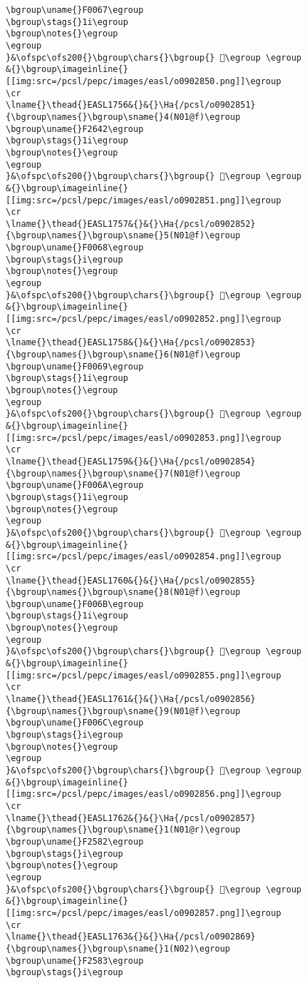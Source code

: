 \begin{verbatim}
\bgroup\uname{}F0067\egroup
\bgroup\stags{}1i\egroup
\bgroup\notes{}\egroup
\egroup
}&\ofspc\ofs200{}\bgroup\chars{}\bgroup{} 󰁧\egroup \egroup
&{}\bgroup\imageinline{}[[img:src=/pcsl/pepc/images/easl/o0902850.png]]\egroup
\cr
\lname{}\thead{}EASL1756&{}&{}\Ha{/pcsl/o0902851}{\bgroup\names{}\bgroup\sname{}4(N01@f)\egroup
\bgroup\uname{}F2642\egroup
\bgroup\stags{}1i\egroup
\bgroup\notes{}\egroup
\egroup
}&\ofspc\ofs200{}\bgroup\chars{}\bgroup{} 󲙂\egroup \egroup
&{}\bgroup\imageinline{}[[img:src=/pcsl/pepc/images/easl/o0902851.png]]\egroup
\cr
\lname{}\thead{}EASL1757&{}&{}\Ha{/pcsl/o0902852}{\bgroup\names{}\bgroup\sname{}5(N01@f)\egroup
\bgroup\uname{}F0068\egroup
\bgroup\stags{}i\egroup
\bgroup\notes{}\egroup
\egroup
}&\ofspc\ofs200{}\bgroup\chars{}\bgroup{} 󰁨\egroup \egroup
&{}\bgroup\imageinline{}[[img:src=/pcsl/pepc/images/easl/o0902852.png]]\egroup
\cr
\lname{}\thead{}EASL1758&{}&{}\Ha{/pcsl/o0902853}{\bgroup\names{}\bgroup\sname{}6(N01@f)\egroup
\bgroup\uname{}F0069\egroup
\bgroup\stags{}1i\egroup
\bgroup\notes{}\egroup
\egroup
}&\ofspc\ofs200{}\bgroup\chars{}\bgroup{} 󰁩\egroup \egroup
&{}\bgroup\imageinline{}[[img:src=/pcsl/pepc/images/easl/o0902853.png]]\egroup
\cr
\lname{}\thead{}EASL1759&{}&{}\Ha{/pcsl/o0902854}{\bgroup\names{}\bgroup\sname{}7(N01@f)\egroup
\bgroup\uname{}F006A\egroup
\bgroup\stags{}1i\egroup
\bgroup\notes{}\egroup
\egroup
}&\ofspc\ofs200{}\bgroup\chars{}\bgroup{} 󰁪\egroup \egroup
&{}\bgroup\imageinline{}[[img:src=/pcsl/pepc/images/easl/o0902854.png]]\egroup
\cr
\lname{}\thead{}EASL1760&{}&{}\Ha{/pcsl/o0902855}{\bgroup\names{}\bgroup\sname{}8(N01@f)\egroup
\bgroup\uname{}F006B\egroup
\bgroup\stags{}1i\egroup
\bgroup\notes{}\egroup
\egroup
}&\ofspc\ofs200{}\bgroup\chars{}\bgroup{} 󰁫\egroup \egroup
&{}\bgroup\imageinline{}[[img:src=/pcsl/pepc/images/easl/o0902855.png]]\egroup
\cr
\lname{}\thead{}EASL1761&{}&{}\Ha{/pcsl/o0902856}{\bgroup\names{}\bgroup\sname{}9(N01@f)\egroup
\bgroup\uname{}F006C\egroup
\bgroup\stags{}i\egroup
\bgroup\notes{}\egroup
\egroup
}&\ofspc\ofs200{}\bgroup\chars{}\bgroup{} 󰁬\egroup \egroup
&{}\bgroup\imageinline{}[[img:src=/pcsl/pepc/images/easl/o0902856.png]]\egroup
\cr
\lname{}\thead{}EASL1762&{}&{}\Ha{/pcsl/o0902857}{\bgroup\names{}\bgroup\sname{}1(N01@r)\egroup
\bgroup\uname{}F2582\egroup
\bgroup\stags{}i\egroup
\bgroup\notes{}\egroup
\egroup
}&\ofspc\ofs200{}\bgroup\chars{}\bgroup{} 󲖂\egroup \egroup
&{}\bgroup\imageinline{}[[img:src=/pcsl/pepc/images/easl/o0902857.png]]\egroup
\cr
\lname{}\thead{}EASL1763&{}&{}\Ha{/pcsl/o0902869}{\bgroup\names{}\bgroup\sname{}1(N02)\egroup
\bgroup\uname{}F2583\egroup
\bgroup\stags{}i\egroup

\end{verbatim}
